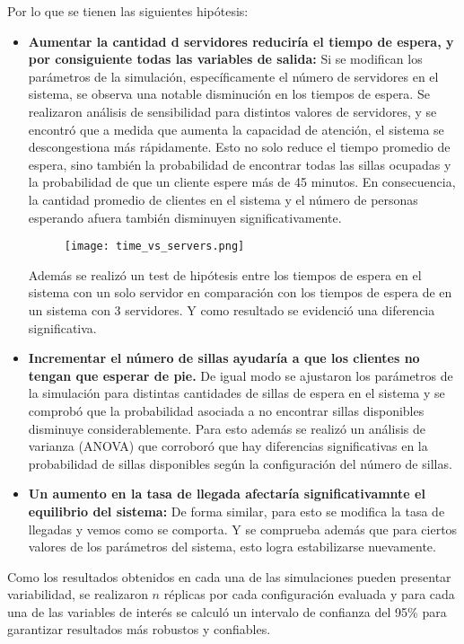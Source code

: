 \documentclass{article}
\begin{document}
Por lo que se tienen las siguientes hipótesis:
\begin{itemize}
    \item \textbf{Aumentar la cantidad d servidores reduciría el tiempo de espera, y por consiguiente todas las variables de salida:}
    Si se modifican los parámetros de la simulación, específicamente el número de servidores en el sistema, se observa una notable disminución en los tiempos de espera. 
    Se realizaron análisis de sensibilidad para distintos valores de servidores, y se encontró que a medida que aumenta la capacidad de atención, el sistema se descongestiona más rápidamente. 
    Esto no solo reduce el tiempo promedio de espera, sino también la probabilidad de encontrar todas las sillas ocupadas y la probabilidad de que un cliente espere más de 45 minutos.
    En consecuencia, la cantidad promedio de clientes en el sistema y el número de personas esperando afuera también disminuyen significativamente.

    \begin{figure}[H]
    \centering
    \texttt{[image: time\_vs\_servers.png]}
    \end{figure}
    \FloatBarrier
    Además se realizó un test de hipótesis entre los tiempos de espera en el sistema con un solo servidor en comparación con los tiempos de espera de en un sistema con 3 servidores. Y como resultado se evidenció una diferencia significativa. 

    \item \textbf{Incrementar el número de sillas ayudaría a que los clientes no tengan que esperar de pie.}
    De igual modo se ajustaron los parámetros de la simulación para distintas cantidades de sillas de espera en el sistema y se comprobó que la probabilidad asociada a no encontrar sillas disponibles disminuye considerablemente.
    Para esto además se realizó un análisis de varianza (ANOVA) que corroboró que hay diferencias significativas en la probabilidad de sillas disponibles según la configuración del número de sillas.

    \item \textbf{Un aumento en la tasa de llegada afectaría significativamnte el equilibrio del sistema:} 
    De forma similar, para esto se modifica la tasa de llegadas y vemos como se comporta. Y se comprueba además que para ciertos valores de los parámetros del sistema, esto logra estabilizarse nuevamente.
\end{itemize}

Como los resultados obtenidos en cada una de las simulaciones pueden presentar variabilidad, se realizaron \(n\) réplicas por cada configuración evaluada y para cada una de las variables de interés se calculó un intervalo de confianza del 95\% para garantizar resultados más robustos y confiables.
\end{document}
